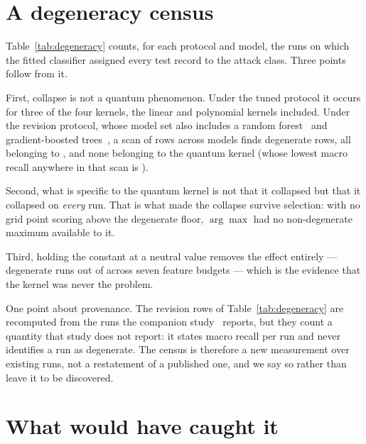 \documentclass[runningheads]{llncs}
\begin{document}
\section{A degeneracy census}\label{sec:census}



Table~\ref{tab:degeneracy} counts, for each protocol and model, the runs on
which the fitted classifier assigned every test record to the attack class.
Three points follow from it.

First, collapse is not a quantum phenomenon. Under the tuned protocol it
occurs for three of the four kernels, the linear and polynomial kernels
included. Under the revision protocol, whose model set also includes a random
forest~\cite{breiman2001rf} and gradient-boosted
trees~\cite{chen2016xgboost}, a scan of \prevRowsScanned{} rows
across \prevModels{} models finds \prevDegRows{} degenerate rows, all
belonging to \prevDegModel{}, and none belonging to the quantum kernel
(whose lowest macro recall anywhere in that scan is
\prevQsvmMinRecall).

Second, what is specific to the quantum kernel is not that it collapsed but
that it collapsed on \emph{every} run. That is what made the collapse
survive selection: with no grid point scoring above the degenerate floor,
$\arg\max$ had no non-degenerate maximum available to it.

Third, holding the constant at a neutral value removes the effect entirely
--- \pkSweepDeg{} degenerate runs out of \pkSweepRuns{} across seven
feature budgets --- which is the evidence that the kernel was never the
problem.

One point about provenance. The revision rows of
Table~\ref{tab:degeneracy} are recomputed from the runs the companion
study~\cite{companion} reports, but they count a quantity that study does
not report: it states macro recall per run and never identifies a run as
degenerate. The census is therefore a new measurement over existing runs,
not a restatement of a published one, and we say so rather than leave it to
be discovered.

\section{What would have caught it}\label{sec:catch}
\end{document}
